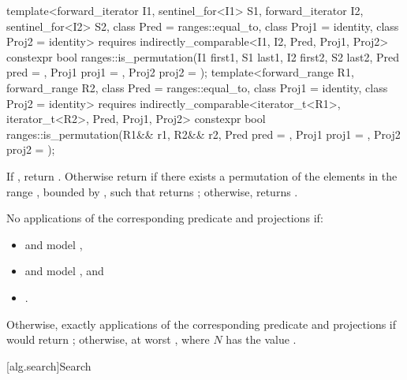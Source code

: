 %
\begin{itemdecl}
template<forward_iterator I1, sentinel_for<I1> S1, forward_iterator I2,
         sentinel_for<I2> S2, class Pred = ranges::equal_to, class Proj1 = identity,
         class Proj2 = identity>
  requires indirectly_comparable<I1, I2, Pred, Proj1, Proj2>
  constexpr bool ranges::is_permutation(I1 first1, S1 last1, I2 first2, S2 last2,
                                        Pred pred = {},
                                        Proj1 proj1 = {}, Proj2 proj2 = {});
template<forward_range R1, forward_range R2, class Pred = ranges::equal_to,
         class Proj1 = identity, class Proj2 = identity>
  requires indirectly_comparable<iterator_t<R1>, iterator_t<R2>, Pred, Proj1, Proj2>
  constexpr bool ranges::is_permutation(R1&& r1, R2&& r2, Pred pred = {},
                                        Proj1 proj1 = {}, Proj2 proj2 = {});
\end{itemdecl}

\begin{itemdescr}
\pnum
\returns
If , return .
Otherwise return  if there exists a permutation of the elements
in the range , bounded by ,
such that
returns ;
otherwise, returns .

\pnum
\complexity
No applications of the corresponding predicate and projections if:
\begin{itemize}
\item {} and  model ,
\item {} and  model , and
\item {}.
\end{itemize}
Otherwise, exactly  applications
of the corresponding predicate and projections
if 
would return ;
otherwise, at worst , where $N$ has the value .
\end{itemdescr}

[alg.search]{Search}

